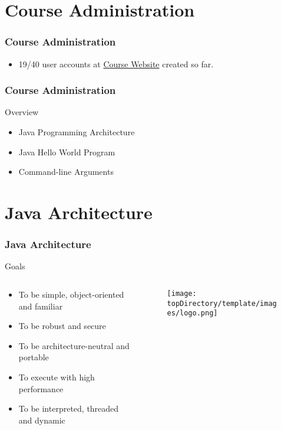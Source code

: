 \documentclass[10pt, compress]{beamer}
\begin{document}
\prepareCover

\section{Course Administration}

\begin{frame}[fragile]
	\frametitle{Course Administration}
	\begin{itemize}
		\item[] 19/40 user accounts at \href{http://www.ghorbanzade.com}{Course Website} created so far.
	\end{itemize}
\end{frame}

\begin{frame}[fragile]
	\frametitle{Course Administration}
	\begin{block}{Overview}
		\begin{itemize}
			\item[] Java Programming Architecture
			\item[] Java Hello World Program
			\item[] Command-line Arguments
		\end{itemize}
	\end{block}
\end{frame}

\section{Java Architecture}

\begin{frame}[fragile]
	\frametitle{Java Architecture}
	\begin{block}{Goals}
		\begin{columns}
			\begin{column}{0.7\textwidth}
			\begin{itemize}
				\item[] To be simple, object-oriented and familiar
				\item[] To be robust and secure
				\item[] To be architecture-neutral and portable
				\item[] To execute with high performance
				\item[] To be interpreted, threaded and dynamic
			\end{itemize}
			\end{column}
			\begin{column}{0.3\textwidth}
			\begin{figure}
				\texttt{[image: \\topDirectory/template/images/logo.png]}
			\end{figure}
			\end{column}
		\end{columns}
	\end{block}
\end{frame}
\end{document}
